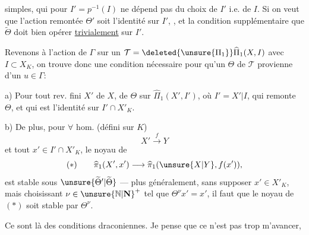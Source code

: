  simples, qui pour $I'=p^{-1}(I)$ ne dépend pas du choix de $I'$ i.e. de $I$. Si on veut que l'action remontée $\Theta'$ soit l'identité sur $I'$, , et la condition supplémentaire que $\widetilde{\Theta}$ doit bien opérer \uline{trivialement} sur $I'$.

Revenons à l'action de $\Gamma$  sur un $\mathcal{T}=\deleted{\unsure{\Pi_1}}\widehat{\Pi}_1(X,I)$ avec $I\subset X_K$, on trouve donc une condition nécessaire pour qu'un  $\Theta$ de $\mathcal{T}$  provienne d'un $u\in\Gamma$:

a) Pour tout rev.  fini $X'$ de $X$,    de $\Theta$ sur $\widehat{\Pi}_1(X',I')$, où $I'=X'|I$, qui remonte $\Theta$, et qui est l'identité sur $I'\cap X'_K$.

b) De plus, pour $\forall$ hom. (défini sur $K$)
\[
X'\xrightarrow{f}Y
\]
et tout $x'\in I'\cap X'_K$, le noyau de
\[
(*)\qquad\widehat{\pi}_1(X',x')\longrightarrow\widehat{\pi}_1(\unsure{X|Y},f(x')),
\]
est stable sous $\unsure{\widetilde{\Theta}^{\prime}|\widetilde{\Theta}}$  --- plus généralement, sans supposer $x'\in X'_K$, mais choisissant $\nu\in\unsure{\mathbb{N}|\mathbf{N}}^{+}$ tel que $\Theta^\nu x'=x'$, il faut que \deleted{$\unsure{\Theta}$} le noyau de $(*)$ soit stable par $\Theta^\nu$.

Ce sont là des conditions draconiennes. Je pense que ce n'est pas trop m'avancer,

